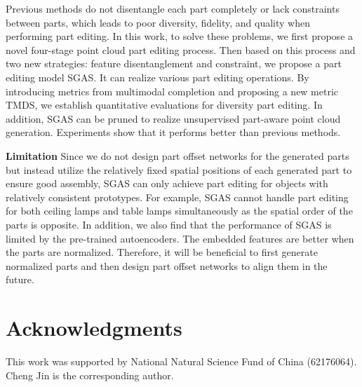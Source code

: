 \documentclass[letterpaper]{article} %
\begin{document}
Previous methods do not disentangle each part completely or lack constraints between parts, which leads to poor diversity, fidelity, and quality when performing part editing. In this work, to solve these problems, we first propose a novel four-stage point cloud part editing process. Then based on this process and two new strategies: feature disentanglement and constraint, we propose a part editing model SGAS. It can realize various part editing operations. By introducing metrics from multimodal completion and proposing a new metric TMDS, we establish quantitative evaluations for diversity part editing. In addition, SGAS can be pruned to realize unsupervised part-aware point cloud generation. Experiments show that it performs better than previous methods.

\noindent \textbf{Limitation} Since we do not design part offset networks for the generated parts but instead utilize the relatively fixed spatial positions of each generated part to ensure good assembly, SGAS can only achieve part editing for objects with relatively consistent prototypes. For example, SGAS cannot handle part editing for both ceiling lamps and table lamps simultaneously as the spatial order of the parts is opposite. In addition, we also find that the performance of SGAS is limited by the pre-trained autoencoders. The embedded features are better when the parts are normalized. Therefore, it will be beneficial to first generate normalized parts and then design part offset networks to align them in the future.

\section{Acknowledgments}

This work was supported by National Natural Science Fund of China (62176064). Cheng Jin is the corresponding author.


\end{document}
